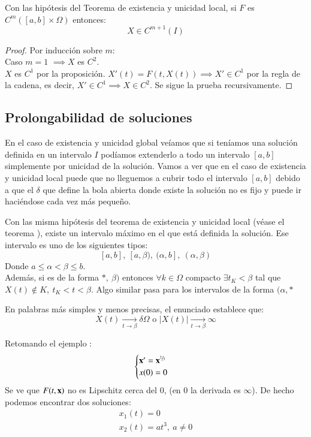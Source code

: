 \begin{pro}
    Con las hipótesis del Teorema de existencia y unicidad local, si $F$ es $C^m ([a,b]\times\Omega)$ entonces:
    $$
        X \in C^{m+1}(I)
    $$
\end{pro}
\begin{proof}
    Por inducción sobre $m$:\\
    Caso $m=1$ $\implies X$ es $C^2$.\\
    $X$ es $C^1$ por la proposición. $X'(t) = F(t, X(t)) \implies X' \in C^1$ por la regla de la cadena, es decir, $X' \in C^1 \implies X \in C^2$. Se sigue la prueba recursivamente.
\end{proof}

\subsection{Prolongabilidad de soluciones}
En el caso de existencia y unicidad global veíamos que si teníamos una solución definida en un intervalo $I$ podíamos extenderlo a todo un intervalo $[a, b]$ simplemente por unicidad de la solución. Vamos a ver que en el caso de existencia y unicidad local puede que no lleguemos a cubrir todo el intervalo $[a, b]$ debido a que el $\delta$ que define la bola abierta donde existe la solución no es fijo y puede ir haciéndose cada vez más pequeño.

\begin{pro}
    Con las misma hipótesis del teorema de existencia y unicidad local (véase el teorema \label{thm:exist-unic-local}), existe un intervalo máximo en el que está definida la solución. Ese intervalo es uno de los siguientes tipos:
    $$[a, b],\ [a,\beta),\ (\alpha, b],\ (\alpha, \beta)
    $$
    Donde $a \leq \alpha < \beta \leq b$.\\
    Además, si es de la forma $*,\ \beta)$ entonces $\forall k \in \Omega$ compacto $\exists t_K < \beta$ tal que $X(t)\not \in K,\ t_K < t < \beta$. Algo similar pasa para los intervalos de la forma $(\alpha, *$
\end{pro}
\begin{obs}
    En palabras más simples y menos precisas, el enunciado establece que:
    $$
        X(t) \xrightarrow[t\to\beta]{} \delta \Omega \text{ o } |X(t)| \xrightarrow[t\to\beta]{} \infty
    $$
\end{obs}
\begin{eg}
    Retomando el ejemplo \label{eg:no-unic}:
    $$
        \begin{cases}
            \mathbf{x}' = \mathbf{x}^{\sfrac{2}{3}}\\
            x(0) = 0
        \end{cases}
    $$
    Se ve que $F(t, \mathbf{x})$ no es Lipschitz cerca del $0$, (en $0$ la derivada es $\infty$). De hecho podemos encontrar dos soluciones:
    \begin{gather*}
        x_1(t) = 0\\
        x_2(t) = at^3,\ a \neq 0
    \end{gather*}
\end{eg}

